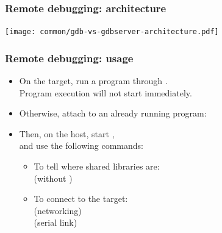 \begin{frame}
  \frametitle{Remote debugging: architecture}
  \begin{center}
    \texttt{[image: common/gdb-vs-gdbserver-architecture.pdf]}
  \end{center}
\end{frame}

\begin{frame}
  \frametitle{Remote debugging: usage}
  \begin{itemize}
  \item On the target, run a program through .\\
    Program execution will not start immediately.\\
  \item Otherwise, attach  to an already running program:\\
  \item Then, on the host, start ,\\
    and use the following  commands:
    \begin{itemize}
    \item To tell  where shared libraries are:\\
       (without )
    \item To connect to the target:\\
       (networking)\\
       (serial link)
    \end{itemize}
  \end{itemize}
\end{frame}

